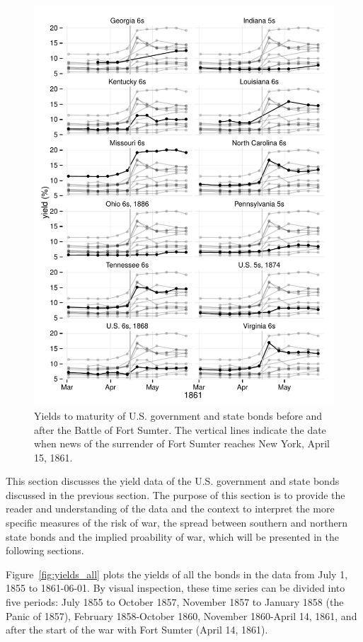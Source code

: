 \documentclass[11pt, oneside, article]{memoir}\usepackage[]{graphicx}\usepackage[]{color}
\begin{document}
\begin{figure}
  \centerfloat
  \includegraphics{figures/fig_yields_sumter-1}
\caption{Yields to maturity of U.S. government and state bonds before and after the Battle of Fort Sumter. The vertical lines indicate the date when news of the surrender of Fort Sumter reaches New York, April 15, 1861.}
\label{fig:yields_sumter}
\end{figure}

This section discusses the yield data of the U.S. government and state bonds discussed in the previous section.
The purpose of this section is to provide the reader and understanding of the data and the context to interpret the more specific measures of the risk of war, the spread between southern and northern state bonds and the implied proability of war, which will be presented in the following sections.

Figure~\ref{fig:yields_all} plots the yields of all the bonds in the data from July  1, 1855 to 1861-06-01.
By visual inspection, these time series can be divided into five periods:
July 1855 to October 1857,
November 1857 to January 1858 (the Panic of 1857),
February 1858-October 1860,
November 1860-April 14, 1861,
and after the start of the war with Fort Sumter (April 14, 1861).
\end{document}
